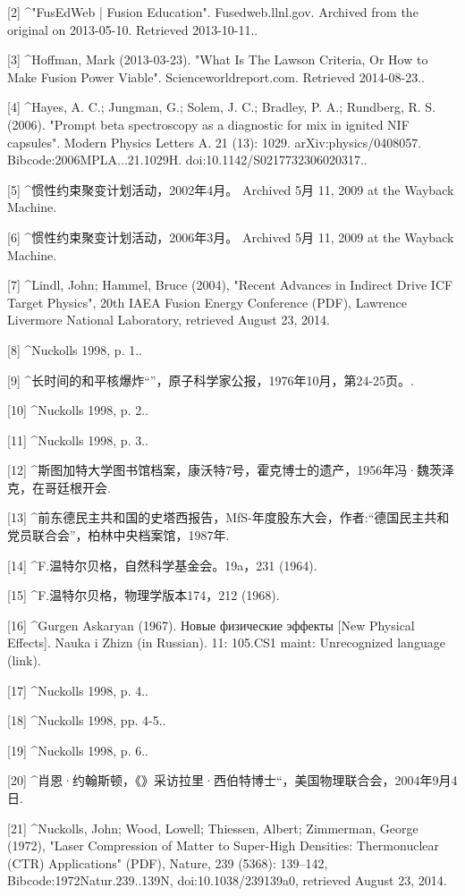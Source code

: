 [2]
^"FusEdWeb | Fusion Education". Fusedweb.llnl.gov. Archived from the original on 2013-05-10. Retrieved 2013-10-11..

[3]
^Hoffman, Mark (2013-03-23). "What Is The Lawson Criteria, Or How to Make Fusion Power Viable". Scienceworldreport.com. Retrieved 2014-08-23..

[4]
^Hayes, A. C.; Jungman, G.; Solem, J. C.; Bradley, P. A.; Rundberg, R. S. (2006). "Prompt beta spectroscopy as a diagnostic for mix in ignited NIF capsules". Modern Physics Letters A. 21 (13): 1029. arXiv:physics/0408057. Bibcode:2006MPLA...21.1029H. doi:10.1142/S0217732306020317..

[5]
^惯性约束聚变计划活动，2002年4月。 Archived 5月 11, 2009 at the Wayback Machine.

[6]
^惯性约束聚变计划活动，2006年3月。 Archived 5月 11, 2009 at the Wayback Machine.

[7]
^Lindl, John; Hammel, Bruce (2004), "Recent Advances in Indirect Drive ICF Target Physics", 20th IAEA Fusion Energy Conference (PDF), Lawrence Livermore National Laboratory, retrieved August 23, 2014.

[8]
^Nuckolls 1998, p. 1..

[9]
^长时间的和平核爆炸“”，原子科学家公报，1976年10月，第24-25页。.

[10]
^Nuckolls 1998, p. 2..

[11]
^Nuckolls 1998, p. 3..

[12]
^斯图加特大学图书馆档案，康沃特7号，霍克博士的遗产，1956年冯·魏茨泽克，在哥廷根开会.

[13]
^前东德民主共和国的史塔西报告，MfS-年度股东大会，作者:“德国民主共和党员联合会”，柏林中央档案馆，1987年.

[14]
^F.温特尔贝格，自然科学基金会。19a，231 (1964).

[15]
^F.温特尔贝格，物理学版本174，212 (1968).

[16]
^Gurgen Askaryan (1967). Новые физические эффекты [New Physical Effects]. Nauka i Zhizn (in Russian). 11: 105.CS1 maint: Unrecognized language (link).

[17]
^Nuckolls 1998, p. 4..

[18]
^Nuckolls 1998, pp. 4-5..

[19]
^Nuckolls 1998, p. 6..

[20]
^肖恩·约翰斯顿，《》采访拉里·西伯特博士“，美国物理联合会，2004年9月4日.

[21]
^Nuckolls, John; Wood, Lowell; Thiessen, Albert; Zimmerman, George (1972), "Laser Compression of Matter to Super-High Densities: Thermonuclear (CTR) Applications" (PDF), Nature, 239 (5368): 139–142, Bibcode:1972Natur.239..139N, doi:10.1038/239139a0, retrieved August 23, 2014.

